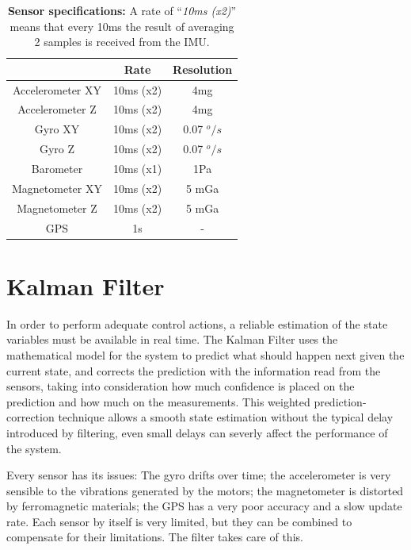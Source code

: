 \documentclass[conference]{IEEEtran}
\begin{document}
\begin{table}[h]
\begin{center}
\begin{tabular}{|c|c|c|}
\hline
 & Rate & Resolution \\
\hline
Accelerometer XY & 10ms (x2)& 4mg\\
\hline
Accelerometer Z  & 10ms (x2)& 4mg\\
\hline
Gyro XY  & 10ms (x2)& 0.07 $^o/s$\\
\hline
Gyro Z  & 10ms (x2)& 0.07 $^o/s$\\
\hline
Barometer  & 10ms (x1) & 1Pa\\
\hline
Magnetometer XY  & 10ms  (x2)& 5 mGa\\
\hline
Magnetometer Z  & 10ms (x2)& 5 mGa\\
\hline
GPS  & 1s & - \\
\hline
\end{tabular}
\end{center}
\caption{\textbf{Sensor specifications:} A rate of ``\textit{10ms (x2)}'' means that every 10ms the result of averaging 2 samples is received from the IMU.}
\label{tab:sensors:resumen}
\end{table}

\section{Kalman Filter}

In order to perform adequate control actions, a reliable estimation of the state variables must be available in real time. The Kalman Filter uses the mathematical model for the system to predict what should happen next given the current state, and corrects the prediction with the information read from the sensors, taking into consideration how much confidence is placed on the prediction and how much on the measurements. This weighted prediction-correction technique allows a smooth state estimation without the typical delay introduced by filtering, even small delays can severly affect the performance of the system.

Every sensor has its issues: The gyro drifts over time; the accelerometer is very sensible to the vibrations generated by the motors; the magnetometer is distorted by ferromagnetic materials; the GPS has a very poor accuracy and a slow update rate. Each sensor by itself is very limited, but they can be combined to compensate for their limitations. The filter takes care of this.
\end{document}
